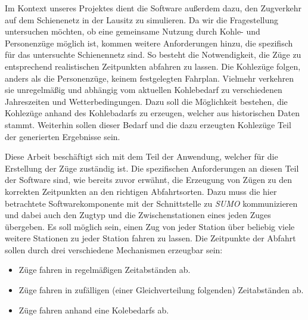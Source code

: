 Im Kontext unseres Projektes dient die Software außerdem dazu, den Zugverkehr auf dem Schienenetz in der Lausitz zu simulieren. Da wir die Fragestellung untersuchen möchten, ob eine gemeinsame Nutzung durch Kohle- und Personenzüge möglich ist, kommen weitere Anforderungen hinzu, die spezifisch für das untersuchte Schienennetz sind. So besteht die Notwendigkeit, die Züge zu entsprechend realistischen Zeitpunkten abfahren zu lassen. Die Kohlezüge folgen, anders als die Personenzüge, keinem festgelegten Fahrplan. Vielmehr verkehren sie unregelmäßig und abhängig vom aktuellen Kohlebedarf zu verschiedenen Jahreszeiten und Wetterbedingungen. Dazu soll die Möglichkeit bestehen, die Kohlezüge anhand des Kohlebadarfs zu erzeugen, welcher aus historischen Daten stammt. Weiterhin sollen dieser Bedarf und die dazu erzeugten Kohlezüge Teil der generierten Ergebnisse sein.

Diese Arbeit beschäftigt sich mit dem Teil der Anwendung, welcher für die Erstellung der Züge zuständig ist. Die spezifischen Anforderungen an diesen Teil der Software sind, wie bereits zuvor erwähnt, die Erzeugung von Zügen zu den korrekten Zeitpunkten an den richtigen Abfahrtsorten. Dazu muss die hier betrachtete Softwarekomponente mit der Schnittstelle zu \emph{SUMO} kommunizieren und dabei auch den Zugtyp und die Zwischenstationen eines jeden Zuges übergeben. Es soll möglich sein, einen Zug von jeder Station über beliebig viele weitere Stationen zu jeder Station fahren zu lassen. Die Zeitpunkte der Abfahrt sollen durch drei verschiedene Mechanismen erzeugbar sein:
\begin{itemize}
    \item Züge fahren in regelmäßigen Zeitabständen ab.
    \item Züge fahren in zufälligen (einer Gleichverteilung folgenden) Zeitabständen ab.
    \item Züge fahren anhand eine Kolebedarfs ab.
\end{itemize}
